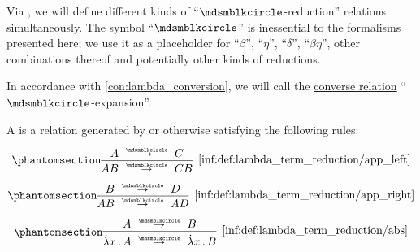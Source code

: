 \begin{definition}\label{def:lambda_term_reduction}
  Via , we will define different kinds of \enquote{\( {\Anon} \)-reduction} relations simultaneously. The symbol \enquote{\( {\Anon} \)} is inessential to the formalisms presented here; we use it as a placeholder for \enquote{\( \beta \)}, \enquote{\( \eta \)}, \enquote{\( \delta \)}, \enquote{\( \beta\eta \)}, other combinations thereof and potentially other kinds of reductions.

  In accordance with \cref{con:lambda_conversion}, we will call the \hyperref[def:binary_relation/converse]{converse relation} \enquote{\( {\Anon} \)-expansion}.

  \begin{thmenum}
     A  is a relation generated by or otherwise satisfying the following rules:
    \begin{paracol}{3}
      \begin{nthcolumn}{0}
        \ParacolAlignmentHack
        \begin{equation*}\taglabel[\ensuremath{ \logic{App}_{\Anon}^L }]{inf:def:lambda_term_reduction/app_left}
          \begin{prooftree}
            \hypo{ A \pred C }
            \infer1[\ref{inf:def:lambda_term_reduction/app_left}]{ AB \pred CB }
          \end{prooftree}
        \end{equation*}
      \end{nthcolumn}

      \begin{nthcolumn}{1}
        \ParacolAlignmentHack
        \begin{equation*}\taglabel[\ensuremath{ \logic{App}_{\Anon}^R }]{inf:def:lambda_term_reduction/app_right}
          \begin{prooftree}
            \hypo{ B \pred D }
            \infer1[\ref{inf:def:lambda_term_reduction/app_right}]{ AB \pred AD }
          \end{prooftree}
        \end{equation*}
      \end{nthcolumn}

      \begin{nthcolumn}{2}
        \ParacolAlignmentHack
        \begin{equation*}\taglabel[\ensuremath{ \logic{Abs}_{\Anon} }]{inf:def:lambda_term_reduction/abs}
          \begin{prooftree}
            \hypo{ A \pred B }
            \infer1[\ref{inf:def:lambda_term_reduction/abs}]{ \qabs x A \pred \qabs x B }
          \end{prooftree}
        \end{equation*}
      \end{nthcolumn}
    \end{paracol}


\end{thmenum}
\end{definition}

